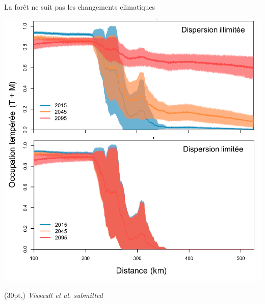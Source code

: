 \documentclass[11pt, compress, aspectratio=1610]{beamer}
\newcommand\smallcitation[1]{%
\begin{textblock*}{\textwidth}(30pt,\textheight)
	\raggedleft \footnotesize\textit{#1}
\end{textblock*}}
\begin{document}
\begin{frame}{La forêt ne suit pas les changements climatiques}

\centering
 \includegraphics[scale=0.45]{figures/Vissault.pdf}\par

\smallcitation{Vissault et al. submitted}

\end{frame}
\end{document}
